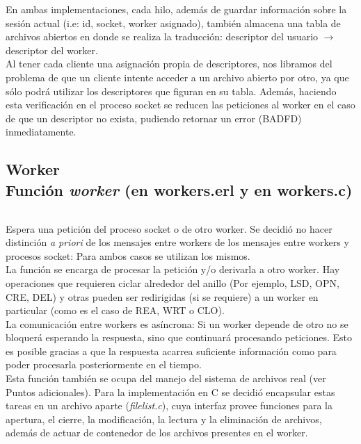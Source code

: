 \documentclass[a4paper, 11pt]{article}
\begin{document}
En ambas implementaciones, cada hilo, además de guardar información sobre la sesión actual (i.e: id, socket, worker asignado), también almacena una tabla de archivos abiertos en donde se realiza la traducción: descriptor del usuario $\rightarrow $ descriptor del worker. \\

Al tener cada cliente una asignación propia de descriptores, nos libramos del problema de que un cliente intente acceder a un archivo abierto por otro, ya que sólo podrá utilizar los descriptores que figuran en su tabla. Además, haciendo esta verificación en el proceso socket se reducen las peticiones al worker en el caso de que un descriptor no exista, pudiendo retornar un error (BADFD) inmediatamente.

\subsection*{Worker\\ {\small Función \textit{worker} (en workers.erl y en workers.c)}}

$  $

Espera una petición del proceso socket o de otro worker. Se decidió no hacer distinción \textit{a priori} de los mensajes entre workers de los mensajes entre workers y procesos socket: Para ambos casos se utilizan los mismos. \\

La función se encarga de procesar la petición y/o derivarla a otro worker. Hay operaciones que requieren ciclar alrededor del anillo (Por ejemplo, LSD, OPN, CRE, DEL) y otras pueden ser redirigidas (si se requiere) a un worker en particular (como es el caso de REA, WRT o CLO). \\

La comunicación entre workers es asíncrona: Si un worker depende de otro no se bloquerá esperando la respuesta, sino que continuará procesando peticiones. Esto es posible gracias a que la respuesta acarrea suficiente información como para poder procesarla posteriormente en el tiempo. \\

Esta función también se ocupa del manejo del sistema de archivos real (ver Puntos adicionales). Para la implementación en C se decidió encapsular estas tareas en un archivo aparte (\textit{filelist.c}), cuya interfaz provee funciones para la apertura, el cierre, la modificación, la lectura y la eliminación de archivos, además de actuar de contenedor de los archivos presentes en el worker. \\
\end{document}
